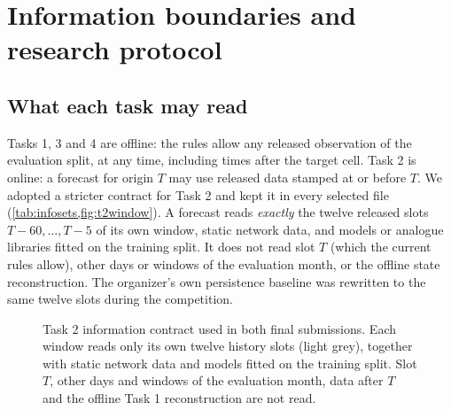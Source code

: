 \section{Information boundaries and research protocol}\label{sec:protocol}

\subsection{What each task may read}
Tasks 1, 3 and 4 are offline: the rules allow any released observation of the evaluation split, at any time,
including times after the target cell. Task 2 is online: a forecast for origin $T$ may use released data stamped at
or before $T$. We adopted a stricter contract for Task 2 and kept it in every selected file
(\cref{tab:infosets,fig:t2window}). A forecast reads \emph{exactly} the twelve released slots $T{-}60,\dots,T{-}5$
of its own window, static network data, and models or analogue libraries fitted on the training split. It does not
read slot $T$ (which the current rules allow), other days or windows of the evaluation month, or the offline state
reconstruction. The organizer's own persistence baseline was rewritten to the same twelve slots during the
competition.

\begin{figure}[h]
\centering
{}
\caption{Task 2 information contract used in both final submissions. Each window reads only its own twelve history
slots (light grey), together with static network data and models fitted on the training split. Slot $T$, other days
and windows of the evaluation month, data after $T$ and the offline Task 1 reconstruction are not read.}\label{fig:t2window}
\end{figure}

